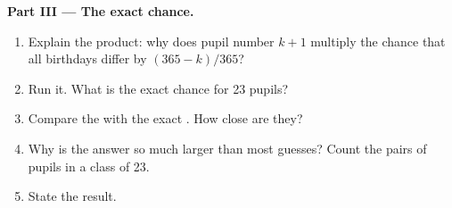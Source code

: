 \begin{problem}
\medskip\noindent\textbf{Part III --- The exact chance.}

\label{lst:g9:randomness-and-simulation:exact}

\begin{enumerate}[resume]
  \item Explain the product: why does pupil number $k + 1$ multiply the chance that
    all birthdays differ by $(365 - k) / 365$?
  \item Run it. What is the exact chance for 23 pupils?
  \item Compare the  with the exact . How close are they?
  \item Why is the answer so much larger than most guesses? Count the pairs of
    pupils in a class of 23.
  \item State the result.
\end{enumerate}
\end{problem}
